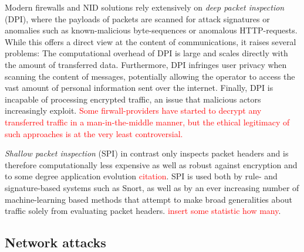 
Modern firewalls and NID solutions rely extensively on \emph{deep packet inspection} (DPI), where the payloads of packets are scanned for attack signatures or anomalies such as known-malicious byte-sequences or anomalous HTTP-requests. While this offers a direct view at the content of communications, it raises several problems: The computational overhead of DPI is large and scales directly with the amount of transferred data. Furthermore, DPI infringes user privacy when scanning the content of messages, potentially allowing the operator to access the vast amount of personal information sent over the internet. Finally, DPI is incapable of processing encrypted traffic, an issue that malicious actors increasingly exploit. \textcolor{red}{Some firwall-providers have started to decrypt any transferred traffic in a man-in-the-middle manner, but the ethical legitimacy of such approaches is at the very least controversial.}

\emph{Shallow packet inspection} (SPI) in contrast only inspects packet headers and is therefore computationally less expensive as well as robust against encryption and to some degree application evolution \textcolor{red}{citation}. SPI is used both by rule- and signature-based systems such as Snort, as well as by an ever increasing number of machine-learning based methods that attempt to make broad generalities about traffic solely from evaluating packet headers. \textcolor{red}{insert some statistic how many}.



\subsection{Network attacks}

